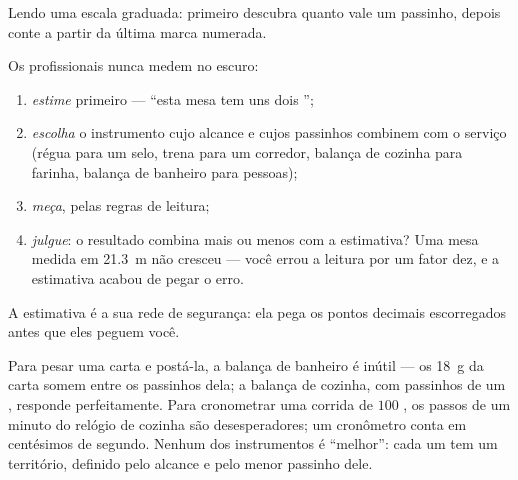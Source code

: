 \begin{omfigure}

{\small Lendo uma escala graduada: primeiro descubra quanto vale um
passinho, depois conte a partir da última marca numerada.}
\end{omfigure}

\begin{method}\label{met:g6:measurement-in-science:estimate}
Os profissionais nunca medem no escuro:
\begin{enumerate}
  \item \emph{estime} primeiro --- ``esta mesa tem uns dois
        '';
  \item \emph{escolha} o instrumento cujo alcance e cujos passinhos
        combinem com o serviço (régua para um selo, trena para um
        corredor, balança de cozinha para farinha, balança de
        banheiro para pessoas);
  \item \emph{meça}, pelas regras de leitura;
  \item \emph{julgue}: o resultado combina mais ou menos com a
        estimativa? Uma mesa medida em \qty{21.3}{m} não cresceu ---
        você errou a leitura por um fator dez, e a estimativa acabou
        de pegar o erro.
\end{enumerate}
A estimativa é a sua rede de segurança: ela pega os pontos decimais
escorregados antes que eles peguem você.
\end{method}

\begin{example}\label{ex:g6:measurement-in-science:choose}
Para pesar uma carta e postá-la, a balança de banheiro é inútil ---
os \qty{18}{g} da carta somem entre os passinhos dela; a balança de
cozinha, com passinhos de um , responde perfeitamente. Para
cronometrar uma corrida de $100$ , os passos de um minuto do
relógio de cozinha são desesperadores; um cronômetro conta em
centésimos de segundo. Nenhum dos instrumentos é ``melhor'': cada um
tem um território, definido pelo alcance e pelo menor passinho dele.
\end{example}


